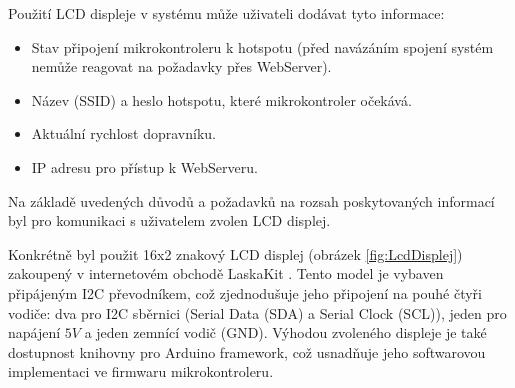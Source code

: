 Použití LCD displeje v systému může uživateli dodávat tyto informace:
\begin{itemize}
	\item Stav připojení mikrokontroleru k hotspotu (před navázáním spojení systém nemůže reagovat na požadavky přes WebServer).
	\item Název (SSID) a heslo hotspotu, které mikrokontroler očekává.
	\item Aktuální rychlost dopravníku.
	\item IP adresu pro přístup k WebServeru.
\end{itemize}

Na základě uvedených důvodů a požadavků na rozsah poskytovaných informací byl pro komunikaci s uživatelem zvolen LCD displej.

Konkrétně byl použit 16x2 znakový LCD displej (obrázek \ref{fig:LcdDisplej}) zakoupený v internetovém obchodě LaskaKit \cite{laskakit_16x2_lcd}. Tento model je vybaven připájeným I2C převodníkem, což zjednodušuje jeho připojení na pouhé čtyři vodiče: dva pro I2C sběrnici (Serial Data (SDA) a Serial Clock (SCL)), jeden pro napájení $5V$ a jeden zemnící vodič (GND). Výhodou zvoleného displeje je také dostupnost knihovny pro Arduino framework, což usnadňuje jeho softwarovou implementaci ve firmwaru mikrokontroleru.
\cite{laskakit_16x2_lcd}

